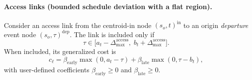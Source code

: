 \paragraph{Access links (bounded schedule deviation with a flat region).}
Consider an access link from the centroid-in node $(s_o,t)^{\mathrm{in}}$
to an origin \emph{departure} event node $(s_o,\tau)^{\mathrm{dep}}$.
The link is included only if
\[
\tau \in \bigl[a_t-\Delta_{\max}^{\mathrm{access}},\; b_t+\Delta_{\max}^{\mathrm{access}}\bigr].
\]
When included, its generalized cost is
\[
c_\ell
=
\beta_{\mathrm{early}}\max(0,a_t-\tau)
+
\beta_{\mathrm{late}}\max(0,\tau-b_t),
\]
with user-defined coefficients $\beta_{\mathrm{early}}\ge 0$ and $\beta_{\mathrm{late}}\ge 0$.

